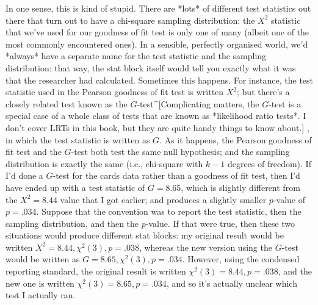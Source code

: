 In one sense, this is kind of stupid. There are *lots* of different test statistics out there that turn out to have a chi-square sampling distribution: the $X^2$ statistic that we've used for our goodness of fit test is only one of many (albeit one of the most commonly encountered ones). In a sensible, perfectly organised world, we'd *always* have a separate name for the test statistic and the sampling distribution: that way, the stat block itself would tell you exactly what it was that the researcher had calculated. Sometimes this happens. For instance, the test statistic used in the Pearson goodness of fit test is written $X^2$; but there's a closely related test known as the $G$-test^[Complicating matters, the $G$-test is a special case of a whole class of tests that are known as *likelihood ratio tests*. I don't cover LRTs in this book, but they are quite handy things to know about.] \cite{Sokal1994}, in which the test statistic is written as $G$. As it happens, the Pearson goodness of fit test and the $G$-test both test the same null hypothesis; and the sampling distribution is exactly the same (i.e., chi-square with $k-1$ degrees of freedom). If I'd done a $G$-test for the cards data rather than a goodness of fit test, then I'd have ended up with a test statistic of $G = 8.65$, which is slightly different from the $X^2 = 8.44$ value that I got earlier; and produces a slightly smaller $p$-value of $p = .034$. Suppose that the convention was to report the test statistic, then the sampling distribution, and then the $p$-value. If that were true, then these two situations would produce different stat blocks: my original result would be written $X^2 = 8.44, \chi^2(3), p = .038$, whereas the new version using the $G$-test would be written as $G = 8.65, \chi^2(3), p = .034$. However, using the condensed reporting standard, the original result is written $\chi^2(3) = 8.44, p = .038$, and the new one is written $\chi^2(3) = 8.65, p = .034$, and so it's actually unclear which test I actually ran.  



